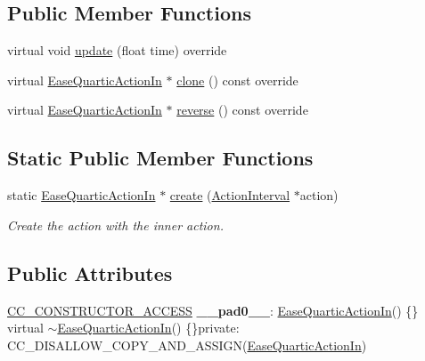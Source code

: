 \subsection*{Public Member Functions}
\begin{DoxyCompactItemize}
\item 
virtual void \hyperlink{classEaseQuarticActionIn_a82026b58ce9a4eee9165380de2dd80dc}{update} (float time) override
\item 
virtual \hyperlink{classEaseQuarticActionIn}{Ease\+Quartic\+Action\+In} $\ast$ \hyperlink{classEaseQuarticActionIn_a8b5a6564a7eb7284fc165aeb2b465986}{clone} () const override
\item 
virtual \hyperlink{classEaseQuarticActionIn}{Ease\+Quartic\+Action\+In} $\ast$ \hyperlink{classEaseQuarticActionIn_a30c40baba57b3dffc444b12fad880b67}{reverse} () const override
\end{DoxyCompactItemize}
\subsection*{Static Public Member Functions}
\begin{DoxyCompactItemize}
\item 
static \hyperlink{classEaseQuarticActionIn}{Ease\+Quartic\+Action\+In} $\ast$ \hyperlink{classEaseQuarticActionIn_ad4bad3b0bfd638fae2c0cdfb986e4c30}{create} (\hyperlink{classActionInterval}{Action\+Interval} $\ast$action)
\begin{DoxyCompactList}\small\item\em Create the action with the inner action. \end{DoxyCompactList}\end{DoxyCompactItemize}
\subsection*{Public Attributes}
\begin{DoxyCompactItemize}
\item 
\mbox{\label{classEaseQuarticActionIn_ade715ce1040629deaa0aa7acf99be69a}} 
\hyperlink{_2cocos2d_2cocos_2base_2ccConfig_8h_a25ef1314f97c35a2ed3d029b0ead6da0}{C\+C\+\_\+\+C\+O\+N\+S\+T\+R\+U\+C\+T\+O\+R\+\_\+\+A\+C\+C\+E\+SS} {\bfseries \+\_\+\+\_\+pad0\+\_\+\+\_\+}\+: \hyperlink{classEaseQuarticActionIn}{Ease\+Quartic\+Action\+In}() \{\} virtual $\sim$\hyperlink{classEaseQuarticActionIn}{Ease\+Quartic\+Action\+In}() \{\}private\+: C\+C\+\_\+\+D\+I\+S\+A\+L\+L\+O\+W\+\_\+\+C\+O\+P\+Y\+\_\+\+A\+N\+D\+\_\+\+A\+S\+S\+I\+GN(\hyperlink{classEaseQuarticActionIn}{Ease\+Quartic\+Action\+In})
\end{DoxyCompactItemize}
